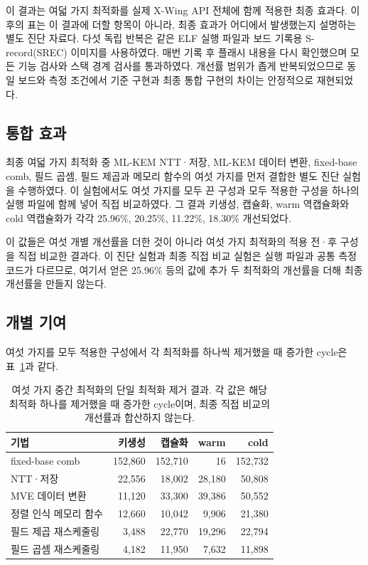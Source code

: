 \documentclass[runningheads,orivec]{llncs}
\newcommand{\xwing}{X-Wing}
\begin{document}
이 결과는 여덟 가지 최적화를 실제 \xwing{} API 전체에 함께 적용한 최종 효과다.
이후의 표는 이 결과에 더할 항목이 아니라, 최종 효과가 어디에서 발생했는지 설명하는
별도 진단 자료다. 다섯 독립 반복은 같은 ELF 실행 파일과 보드 기록용 S-record(SREC)
이미지를 사용하였다. 매번 기록 후 플래시 내용을 다시 확인했으며 모든 기능 검사와
스택 경계 검사를 통과하였다. 개선률 범위가 좁게 반복되었으므로 동일 보드와 측정
조건에서 기준 구현과 최종 통합 구현의 차이는 안정적으로 재현되었다.

\subsection{통합 효과}

최종 여덟 가지 최적화 중 ML-KEM NTT·저장, ML-KEM 데이터 변환, fixed-base comb,
필드 곱셈, 필드 제곱과 메모리 함수의 여섯 가지를 먼저 결합한 별도 진단 실험을
수행하였다. 이 실험에서도 여섯 가지를 모두 끈 구성과 모두 적용한 구성을 하나의
실행 파일에 함께 넣어 직접 비교하였다. 그 결과 키생성, 캡슐화, warm 역캡슐화와
cold 역캡슐화가 각각 25.96\%, 20.25\%, 11.22\%, 18.30\% 개선되었다.

이 값들은 여섯 개별 개선률을 더한 것이 아니라 여섯 가지 최적화의 적용 전·후 구성을
직접 비교한 결과다. 이 진단 실험과 최종 직접 비교 실험은 실행 파일과 공통 측정 코드가
다르므로, 여기서 얻은 25.96\% 등의 값에 추가 두 최적화의 개선률을 더해 최종
개선률을 만들지 않는다.

\subsection{개별 기여}

여섯 가지를 모두 적용한 구성에서 각 최적화를 하나씩 제거했을 때 증가한 cycle은
표~\ref{tab:leave-one-out}과 같다.
\begin{table}[t]
\centering
\caption{여섯 가지 중간 최적화의 단일 최적화 제거 결과. 각 값은 해당 최적화 하나를
제거했을 때 증가한 cycle이며, 최종 직접 비교의 개선률과 합산하지 않는다.}
\label{tab:leave-one-out}
\footnotesize
\setlength{\tabcolsep}{3.0pt}
\begin{tabular}{@{}lrrrr@{}}
\toprule
기법 & 키생성 & 캡슐화 & warm & cold \\
\midrule
fixed-base comb & 152,860 & 152,710 & 16 & 152,732 \\
NTT·저장 & 22,556 & 18,002 & 28,180 & 50,808 \\
MVE 데이터 변환 & 11,120 & 33,300 & 39,386 & 50,552 \\
정렬 인식 메모리 함수 & 12,660 & 10,042 & 9,906 & 21,380 \\
필드 제곱 재스케줄링 & 3,488 & 22,770 & 19,296 & 22,794 \\
필드 곱셈 재스케줄링 & 4,182 & 11,950 & 7,632 & 11,898 \\
\bottomrule
\end{tabular}
\end{table}
\end{document}
